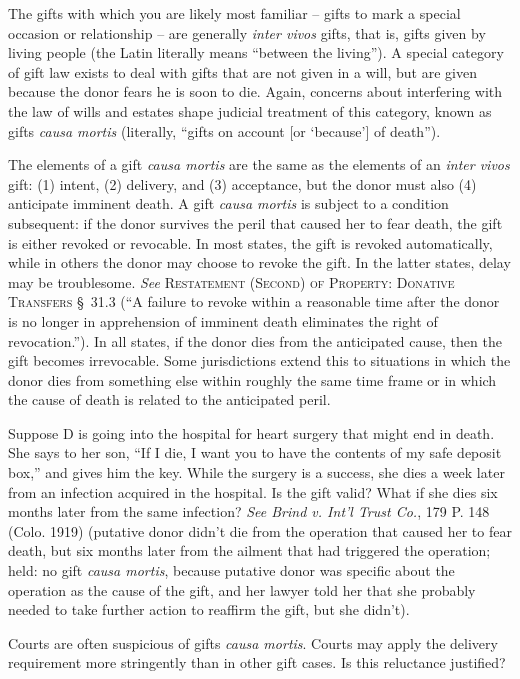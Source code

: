 The gifts with which you are likely most familiar -- gifts to mark a special
occasion or relationship -- are generally \textit{inter vivos} gifts, that is,
gifts given by living people (the Latin literally means ``between the
living'').  A special category of gift law exists to deal with gifts that are
not given in a will, but are given because the donor fears he is soon to die. 
Again, concerns about interfering with the law of wills and estates shape
judicial treatment of this category, known as gifts \textit{causa mortis}
(literally, ``gifts on account [or `because'] of death'').

The elements of a gift \textit{causa mortis} are the same as the elements of an
\textit{inter vivos} gift: (1) intent, (2) delivery, and (3) acceptance, but
the donor must also (4) anticipate imminent death. A gift \textit{causa mortis}
is subject to a condition subsequent: if the donor survives the peril that
caused her to fear death, the gift is either revoked or revocable.  In most
states, the gift is revoked automatically, while in others the donor may choose
to revoke the gift.  In the latter states, delay may be troublesome. 
\textit{See} \textsc{Restatement (Second) of Property: Donative Transfers}
\S~31.3 (``A
failure to revoke within a reasonable time after the donor is no longer in
apprehension of imminent death eliminates the right of revocation.'').  In all
states, if the donor dies from the anticipated cause, then the gift becomes
irrevocable.  Some jurisdictions extend this to situations in which the donor
dies from something else within roughly the same time frame or in which the
cause of death is related to the anticipated peril.

Suppose D is going into the hospital for heart surgery that might end in death. 
She says to her son, ``If I die, I want you to have the contents of my safe
deposit box,'' and gives him the key.  While the surgery is a success, she dies
a week later from an infection acquired in the hospital.  Is the gift valid?
What if she dies six months later from the same infection?  \emph{See Brind v. Int'l
Trust Co.}, 179 P. 148 (Colo. 1919) (putative donor didn't die from the
operation that caused her to fear death, but six months later from the ailment
that had triggered the operation; held: no gift \textit{causa mortis}, because
putative donor was specific about the operation as the cause of the gift, and
her lawyer told her that she probably needed to take further action to reaffirm
the gift, but she didn't).  

Courts are often suspicious of gifts \textit{causa mortis}.  Courts may apply
the delivery requirement more stringently than in other gift cases.  Is this
reluctance justified? 

